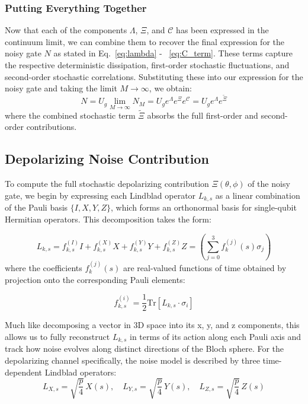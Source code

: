 \documentclass[9pt,a4paper,twocolumn,twoside]{tau-class/tau}
\begin{document}
\subsubsection*{Putting Everything Together}

Now that each of the components $\Lambda$, $\Xi$, and $\mathcal{C}$ has been expressed in the continuum limit, we can combine them to recover the final expression for the noisy gate $N$ as stated in Eq.~\eqref{eq:lambda} - ~\eqref{eq:C_term}. These terms capture the respective deterministic dissipation, first-order stochastic fluctuations, and second-order stochastic correlations.
Substituting these into our expression for the noisy gate and taking the limit $M \to \infty$, we obtain:
\begin{equation}
    N = U_g \lim_{M \to \infty} N_M = U_g e^{\Lambda} e^{\Xi} e^{\mathcal{C}} = U_g e^{\Lambda} e^{\tilde{\Xi}}
\end{equation}
where the combined stochastic term $\tilde{\Xi}$ absorbs the full first-order and second-order contributions. 

\subsection{Depolarizing Noise Contribution}
To compute the full stochastic depolarizing contribution $\Xi(\theta, \phi)$ of the noisy gate, we begin by expressing each Lindblad operator $L_{k,s}$ as a linear combination of the Pauli basis $\{I, X, Y, Z\}$, which forms an orthonormal basis for single-qubit Hermitian operators. This decomposition takes the form:

\begin{equation}
    L_{k,s} = f_{k,s}^{(I)} I + f_{k,s}^{(X)} X + f_{k,s}^{(Y)} Y + f_{k,s}^{(Z)} Z = \left( \sum_{j=0}^{3} f_k^{(j)}(s) \sigma_j \right)
    \label{eq: L_k_s in pauli base}
\end{equation}
where the coefficients $f_k^{(j)}(s)$ are real-valued functions of time obtained by projection onto the corresponding Pauli elements:

\begin{equation}
    f_{k,s}^{(i)} = \frac{1}{2} \text{Tr} \left[ L_{k,s} \cdot \sigma_i \right]
    \label{eq: f as trace}
\end{equation}

Much like decomposing a vector in 3D space into its x, y, and z components, this allows us to fully reconstruct $L_{k,s}$ in terms of its action along each Pauli axis and track how noise evolves along distinct directions of the Bloch sphere. For the depolarizing channel specifically, the noise model is described by three time-dependent Lindblad operators:
\begin{equation}
L_{X,s} = \sqrt{\frac{p}{4}} \, X(s), \quad
L_{Y,s} = \sqrt{\frac{p}{4}} \, Y(s), \quad
L_{Z,s} = \sqrt{\frac{p}{4}} \, Z(s)
\end{equation}
\end{document}

